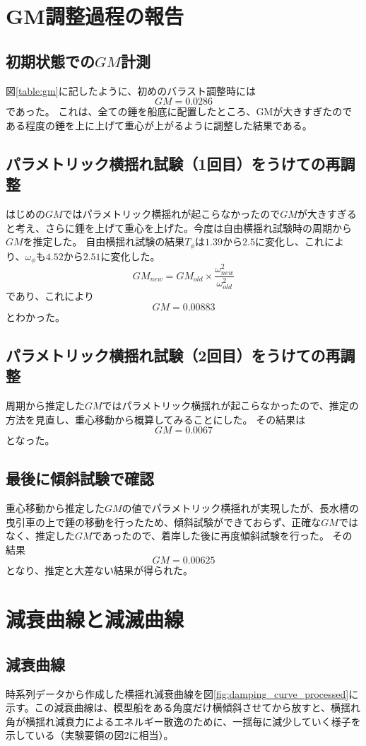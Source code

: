 \documentclass[dvipdfmx,a4paper]{jreport} %
\begin{document}
\section{GM調整過程の報告}

\subsection{初期状態での$GM$計測}
図\ref{table:gm}に記したように、初めのバラスト調整時には
$$GM=0.0286$$
であった。
これは、全ての錘を船底に配置したところ、GMが大きすぎたのである程度の錘を上に上げて重心が上がるように調整した結果である。

\subsection{パラメトリック横揺れ試験（1回目）をうけての再調整}
はじめの$GM$ではパラメトリック横揺れが起こらなかったので$GM$が大きすぎると考え、さらに錘を上げて重心を上げた。今度は自由横揺れ試験時の周期から$GM$を推定した。
自由横揺れ試験の結果$T_\phi$は$1.39$から$2.5$に変化し、これにより、$\omega_\phi$も$4.52$から$2.51$に変化した。
\begin{equation}
    GM_{new}=GM_{old}\times\frac{\omega_{new}^2}{\omega_{old}^2}
\end{equation}
であり、これにより
$$GM=0.00883$$
とわかった。

\subsection{パラメトリック横揺れ試験（2回目）をうけての再調整}
周期から推定した$GM$ではパラメトリック横揺れが起こらなかったので、推定の方法を見直し、重心移動から概算してみることにした。
その結果は
$$GM=0.0067$$
となった。

\subsection{最後に傾斜試験で確認}
重心移動から推定した$GM$の値でパラメトリック横揺れが実現したが、長水槽の曳引車の上で錘の移動を行ったため、傾斜試験ができておらず、正確な$GM$ではなく、推定した$GM$であったので、着岸した後に再度傾斜試験を行った。
その結果
$$GM=0.00625$$
となり、推定と大差ない結果が得られた。

\section{減衰曲線と減滅曲線}
\subsection{減衰曲線}
時系列データから作成した横揺れ減衰曲線を図\ref{fig:damping_curve_processed}に示す。この減衰曲線は、模型船をある角度だけ横傾斜させてから放すと、横揺れ角が横揺れ減衰力によるエネルギー散逸のために、一揺毎に減少していく様子を示している（実験要領の図2に相当）。
\end{document}
